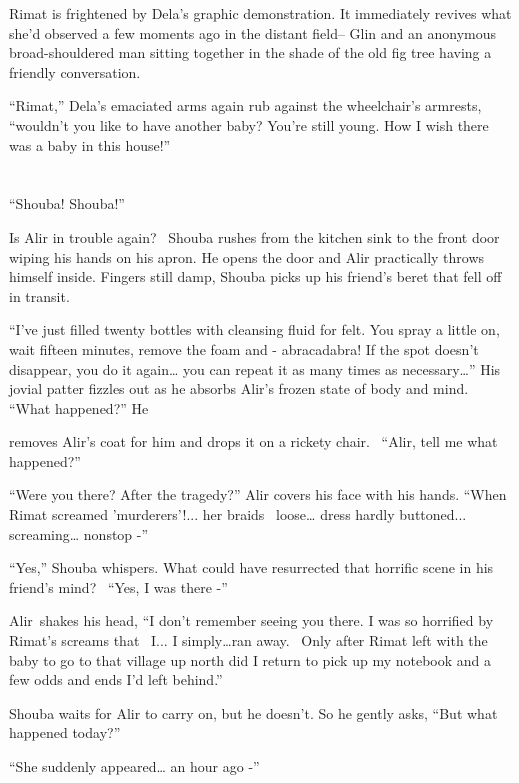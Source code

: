 \documentclass[twoside,11pt]{book}
\begin{document}
Rimat is frightened by Dela's graphic demonstration. It immediately revives what she'd observed a few moments ago in the
distant field-- Glin and an anonymous broad-shouldered man sitting together in the shade of the old fig tree having a
friendly conversation.

``Rimat,'' Dela's emaciated arms again rub against the wheelchair's armrests,
``wouldn't you like to have another baby? You're still young. How I wish there was a baby in this
house!''


\bigskip

\chapter{}

``Shouba! Shouba!''

Is Alir in trouble again?~ Shouba rushes from the kitchen sink to the front door wiping his hands on his apron. He opens
the door and Alir practically throws himself inside. Fingers still damp, Shouba picks up his friend's beret that fell
off in transit.

``I've just filled twenty bottles with cleansing fluid for felt. You spray a little on, wait fifteen
minutes, remove the foam and - abracadabra! If the spot doesn't disappear, you do it again{\dots} you can repeat it as
many times as necessary{\dots}'' His jovial patter fizzles out as he absorbs Alir's frozen state of body
and mind. ``What happened?'' He

removes Alir's coat for him and drops it on a rickety chair. \ ``Alir, tell me what
happened?''

``Were you there? After the tragedy?'' Alir covers his face with his hands.
``When Rimat screamed 'murderers'!... her braids \ loose{\dots} dress hardly buttoned... screaming{\dots}
nonstop -''

``Yes,'' Shouba whispers. What could have resurrected that horrific scene in his friend's
mind? \ {}``Yes, I was there -''

Alir~shakes his head, ``I don't remember seeing you there.{ }I was so horrified by Rimat's
screams that \ I... I simply{\dots}ran away. \ Only after Rimat left with the baby to go to that village up north did I
return to pick up my notebook and a few odds and ends I'd left behind.''

Shouba waits for Alir to carry on, but he doesn't. So he gently asks, ``But what happened
today?''

``She suddenly appeared{\dots} an hour ago -''
\end{document}
